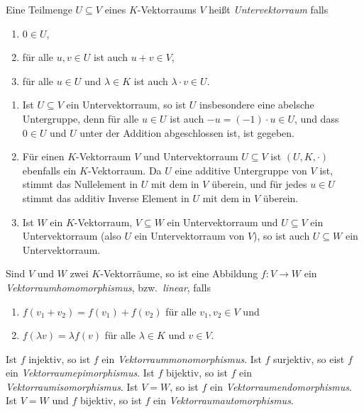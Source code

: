 \begin{defi}
 Eine Teilmenge $U \subseteq V$ eines $K$-Vektorraums $V$ heißt \emph{Untervektorraum} falls
 \begin{enumerate}[label=\roman*)]
  \item
   $0 \in U$,
  \item
   für alle $u,v \in U$ ist auch $u+v \in V$,
  \item
   für alle $u \in U$ und $\lambda \in K$ ist auch $\lambda \cdot v \in U$.
 \end{enumerate}

\end{defi}


\begin{bem}
 \begin{enumerate}[leftmargin=*]
  \item
   Ist $U \subseteq V$ ein Untervektorraum, so ist $U$ insbesondere eine abelsche Untergruppe, denn für alle $u \in U$ ist auch $-u = (-1) \cdot u \in U$, und dass $0 \in U$ und $U$ unter der Addition abgeschlossen ist, ist gegeben.
  \item
   Für einen $K$-Vektorraum $V$ und Untervektorraum $U \subseteq V$ ist $(U,K,\cdot)$ ebenfalls ein $K$-Vektorraum. Da $U$ eine additive Untergruppe von $V$ ist, stimmt das Nullelement in $U$ mit dem in $V$ überein, und für jedes $u \in U$ stimmt das additiv Inverse Element in $U$ mit dem in $V$ überein.
  \item
   Ist $W$ ein $K$-Vektorraum, $V \subseteq W$ ein Untervektorraum und $U \subseteq V$ ein Untervektorraum (also $U$ ein Untervektorraum von $V$), so ist auch $U \subseteq W$ ein Untervektorraum.
 \end{enumerate}
\end{bem}


\begin{defi}
 Sind $V$ und $W$ zwei $K$-Vektorräume, so ist eine Abbildung $f \colon V \to W$ ein \emph{Vektorraumhomomorphismus}, bzw.\ \emph{linear}, falls
 \begin{enumerate}[label=\roman*)]
  \item
   $f(v_1 + v_2) = f(v_1) + f(v_2)$ für alle $v_1, v_2 \in V$ und
  \item
   $f(\lambda v) = \lambda f(v)$ für alle $\lambda \in K$ und $v \in V$.
 \end{enumerate}
 Ist $f$ injektiv, so ist $f$ ein \emph{Vektorraummonomorphismus}. Ist $f$ surjektiv, so eist $f$ ein \emph{Vektorraumepimorphismus}. Ist $f$ bijektiv, so ist $f$ ein \emph{Vektorraumisomorphismus}. Ist $V = W$, so ist $f$ ein \emph{Vektorraumendomorphismus}. Ist $V = W$ und $f$ bijektiv, so ist $f$ ein \emph{Vektorraumautomorphismus}.
\end{defi}


